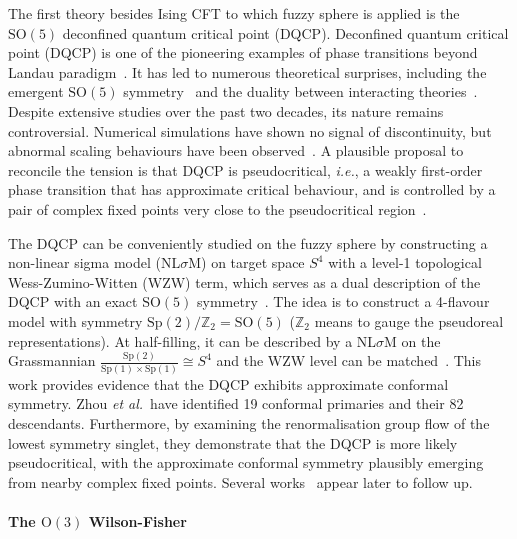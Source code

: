 \documentclass{timesjhep}
\begin{document}
The first theory besides Ising CFT to which fuzzy sphere is applied is the $\mathrm{SO}(5)$ deconfined quantum critical point (DQCP). Deconfined quantum critical point (DQCP) is one of the pioneering examples of phase transitions beyond Landau paradigm~\cite{Senthil2003DQCP,Senthil2004DQCP,Senthil2023DQCP}. It has led to numerous theoretical surprises, including the emergent $\mathrm{SO}(5)$ symmetry~\cite{Nahum2015DQCP} and the duality between interacting theories~\cite{Wang2017DQCP}. Despite extensive studies over the past two decades, its nature remains controversial. Numerical simulations have shown no signal of discontinuity, but abnormal scaling behaviours have been observed~\cite{Senthil2023DQCP}. A plausible proposal to reconcile the tension is that DQCP is pseudocritical, \textit{i.e.}, a weakly first-order phase transition that has approximate critical behaviour, and is controlled by a pair of complex fixed points very close to the pseudocritical region~\cite{Wang2017DQCP,Gorbenko2018Complex}.

The DQCP can be conveniently studied on the fuzzy sphere by constructing a non-linear sigma model (NL$\sigma$M) on target space $S^4$ with a level-1 topological Wess-Zumino-Witten (WZW) term, which serves as a dual description of the DQCP with an exact $\mathrm{SO}(5)$ symmetry~\cite{Nahum2015DQCP,Wang2017DQCP}. The idea is to construct a 4-flavour model with symmetry $\mathrm{Sp}(2)/\mathbb{Z}_2=\mathrm{SO}(5)$ ($\mathbb{Z}_2$ means to gauge the pseudoreal representations). At half-filling, it can be described by a NL$\sigma$M on the Grassmannian $\tfrac{\mathrm{Sp}(2)}{\mathrm{Sp}(1)\times\mathrm{Sp}(1)}\cong S^4$ and the WZW level can be matched~\cite{Lee2014WZW,Ippoliti2018DQCP,Wang2020DQCP}. This work provides evidence that the DQCP exhibits approximate conformal symmetry. Zhou \textit{et al.}~have identified 19 conformal primaries and their 82 descendants. Furthermore, by examining the renormalisation group flow of the lowest symmetry singlet, they demonstrate that the DQCP is more likely pseudocritical, with the approximate conformal symmetry plausibly emerging from nearby complex fixed points. Several works~\cite{Chen2023WZW,Chen2024WZW} appear later to follow up.

\paragraph{The $\mathrm{O}(3)$ Wilson-Fisher~\cite{Han2023Dec}}
\end{document}
